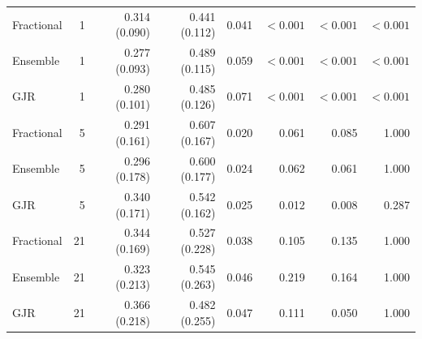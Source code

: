 \begin{tabular}{lrrrrrrr}
Fractional & 1 & 0.314 (0.090) & 0.441 (0.112) & 0.041 & $<0.001$ & $<0.001$ & $<0.001$ \\
Ensemble & 1 & 0.277 (0.093) & 0.489 (0.115) & 0.059 & $<0.001$ & $<0.001$ & $<0.001$ \\
GJR & 1 & 0.280 (0.101) & 0.485 (0.126) & 0.071 & $<0.001$ & $<0.001$ & $<0.001$ \\
Fractional & 5 & 0.291 (0.161) & 0.607 (0.167) & 0.020 & 0.061 & 0.085 & 1.000 \\
Ensemble & 5 & 0.296 (0.178) & 0.600 (0.177) & 0.024 & 0.062 & 0.061 & 1.000 \\
GJR & 5 & 0.340 (0.171) & 0.542 (0.162) & 0.025 & 0.012 & 0.008 & 0.287 \\
Fractional & 21 & 0.344 (0.169) & 0.527 (0.228) & 0.038 & 0.105 & 0.135 & 1.000 \\
Ensemble & 21 & 0.323 (0.213) & 0.545 (0.263) & 0.046 & 0.219 & 0.164 & 1.000 \\
GJR & 21 & 0.366 (0.218) & 0.482 (0.255) & 0.047 & 0.111 & 0.050 & 1.000 \\
\bottomrule
\end{tabular}
